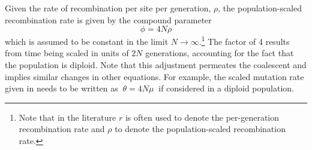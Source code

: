 %

%

Given the rate of recombination per site per generation, $\rho$, the population-scaled recombination rate is given by the compound parameter
\begin{equation}\label{eq:recrate}
	\phi = 4 N \rho
\end{equation}
which is assumed to be constant in the limit ${N\rightarrow\infty}$.\footnote{Note that in the literature $r$ is often used to denote the per-generation recombination rate and $\rho$ to denote the population-scaled recombination rate.}
The factor of 4 results from time being scaled in units of ${2 N}$ generations, accounting for the fact that the population is diploid.
Note that this adjustment permeates the coalescent and implies similar changes in other equations.
For example, the scaled mutation rate given in  needs to be written as $~{\theta = 4 N \mu}~$ if considered in a diploid population.

